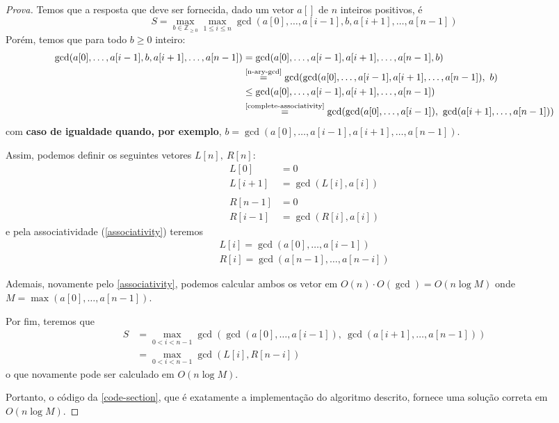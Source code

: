 \documentclass{article}
\begin{document}
\begin{proof}[Prova]
    Temos que a resposta que deve ser fornecida, dado um vetor \(a[]\) de \(n\) inteiros positivos, é 
    \[
        S = \max_{b \in \mathbb{Z}_{\geq 0}}\max_{1 \leq i \leq n}\gcd(a[0], \dotsc, a[i-1], b, a[i+1], \dotsc, a[n-1])    
    \]
    Porém, temos que para todo \(b \geq 0\) inteiro:
    \begin{align*}
        \gcd(
            a[0], \dotsc, a[i-1], b, a[i+1], \dotsc, a[n-1]
        )  
        &= \gcd(a[0], \dotsc, a[i-1], a[i+1], \dotsc, a[n-1], b)
        \\
        &\overset{\text{\cref{n-ary-gcd}}}{=} 
        \gcd(
            \gcd(a[0], \dotsc, a[i-1], a[i+1], \dotsc, a[n-1]),\ 
            b
        ) 
        \\
        &\leq 
        \gcd(a[0], \dotsc, a[i-1], a[i+1], \dotsc, a[n-1])
        \\ 
        &\overset{\text{\cref{complete-associativity}}}{=}
        \gcd(
            \gcd(a[0], \dotsc, a[i-1]),\
            \gcd(a[i+1], \dotsc, a[n-1])
        )
    \end{align*}
    com \textbf{caso de igualdade quando, por exemplo}, \(b = \gcd(a[0], \dotsc, a[i-1], a[i+1], \dotsc, a[n-1])\). 

    Assim, podemos definir os seguintes vetores \(L[n], \ R[n]\):
    \begin{align*}
        L[0] &= 0 \\
        L[i + 1] &= \gcd(L[i], a[i]) \\
        \\
        R[n - 1] &= 0 \\
        R[i - 1] &= \gcd(R[i], a[i])
    \end{align*}
    e pela associatividade (\cref{associativity}) teremos
    \begin{align*}
        L[i] = \gcd(a[0], \dotsc, a[i - 1]) \\
        R[i] = \gcd(a[n - 1], \dotsc, a[n - i])
    \end{align*}

    Ademais, novamente pelo \cref{associativity}, podemos calcular ambos os vetor em \(O(n) \cdot O(\gcd) = O(n\log M)\) onde \(M = \max(a[0], \dotsc, a[n-1])\). 

    Por fim, teremos que 
    \begin{align*}
        S &= \max_{0 < i < n - 1}
        \gcd(
            \gcd(a[0], \dotsc, a[i-1]),\
            \gcd(a[i+1], \dotsc, a[n-1])
        ) \\
        &=
        \max_{0 < i < n - 1}\gcd(L[i], R[n-i])
    \end{align*}
    o que novamente pode ser calculado em \(O(n \log M)\).

    Portanto, o código da \cref{code-section}, que é exatamente a implementação do algoritmo descrito, fornece uma solução correta em \(O(n \log M)\).
\end{proof}
 
\end{document}
